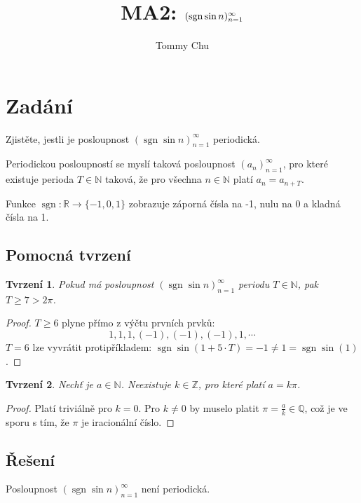 \documentclass[a4paper]{article}
\title{MA2: $(\sgn \sin n)^{\infty}_{n=1}$}
\author{Tommy Chu}
\date{}
\newtheorem{theorem}{Tvrzení}
\DeclareMathOperator{\sgn}{sgn}
\begin{document}
\maketitle
\section*{Zadání}

Zjistěte, jestli je posloupnost $(\sgn \sin n)^{\infty}_{n=1}$ periodická.

Periodickou posloupností se myslí taková posloupnost $(a_n)^{\infty}_{n=1}$, pro které existuje perioda $T \in \mathbb{N}$ taková, že pro všechna $n \in \mathbb{N}$ platí $a_n = a_{n + T}$.

Funkce $\sgn : \mathbb{R} \rightarrow \{-1, 0, 1\}$ zobrazuje záporná čísla na -1, nulu na 0 a kladná čísla na 1.

\subsection*{Pomocná tvrzení}

\begin{theorem}
    Pokud má posloupnost $(\sgn \sin n)^{\infty}_{n=1}$ periodu $T \in \mathbb{N}$, pak ${T \geq 7 > 2\pi}$.
\end{theorem}
\begin{proof}
    $T \geq 6$  plyne přímo z výčtu prvních prvků: \[1, 1, 1, (-1), (-1), (-1), 1, \cdots\]
    $T = 6$ lze vyvrátit protipříkladem: ${\sgn \sin(1 + 5 \cdot T) = -1 \neq 1 = \sgn \sin(1)}$.
\end{proof}

\begin{theorem}
    Nechť je $a \in \mathbb{N}$. Neexistuje $k \in \mathbb{Z}$, pro které platí $a = k\pi$.
\end{theorem}
\begin{proof}
    Platí triviálně pro $k = 0$. Pro $k \neq 0$ by muselo platit $\pi = \frac{a}{k} \in \mathbb{Q}$, což je ve sporu s tím, že $\pi$ je iracionální číslo.
\end{proof}

\subsection*{Řešení}

Posloupnost $(\sgn \sin n)^{\infty}_{n=1}$ není periodická.
\end{document}
